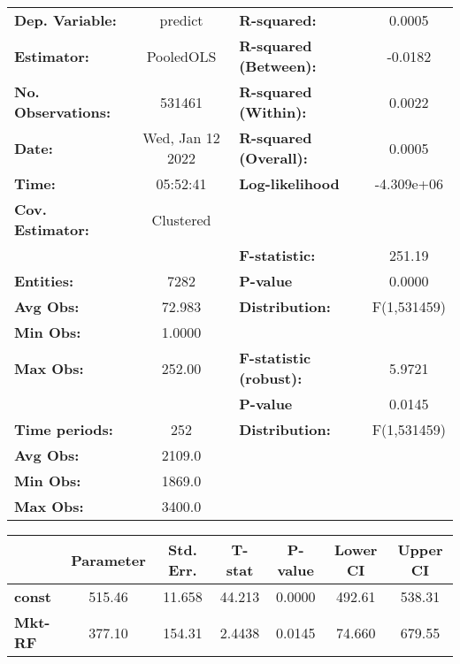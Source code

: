 \begin{center}
\begin{tabular}{lclc}
\toprule
\textbf{Dep. Variable:}    &      predict       & \textbf{  R-squared:         }   &      0.0005      \\
\textbf{Estimator:}        &     PooledOLS      & \textbf{  R-squared (Between):}  &     -0.0182      \\
\textbf{No. Observations:} &       531461       & \textbf{  R-squared (Within):}   &      0.0022      \\
\textbf{Date:}             &  Wed, Jan 12 2022  & \textbf{  R-squared (Overall):}  &      0.0005      \\
\textbf{Time:}             &      05:52:41      & \textbf{  Log-likelihood     }   &    -4.309e+06    \\
\textbf{Cov. Estimator:}   &     Clustered      & \textbf{                     }   &                  \\
\textbf{}                  &                    & \textbf{  F-statistic:       }   &      251.19      \\
\textbf{Entities:}         &        7282        & \textbf{  P-value            }   &      0.0000      \\
\textbf{Avg Obs:}          &       72.983       & \textbf{  Distribution:      }   &   F(1,531459)    \\
\textbf{Min Obs:}          &       1.0000       & \textbf{                     }   &                  \\
\textbf{Max Obs:}          &       252.00       & \textbf{  F-statistic (robust):} &      5.9721      \\
\textbf{}                  &                    & \textbf{  P-value            }   &      0.0145      \\
\textbf{Time periods:}     &        252         & \textbf{  Distribution:      }   &   F(1,531459)    \\
\textbf{Avg Obs:}          &       2109.0       & \textbf{                     }   &                  \\
\textbf{Min Obs:}          &       1869.0       & \textbf{                     }   &                  \\
\textbf{Max Obs:}          &       3400.0       & \textbf{                     }   &                  \\
\bottomrule
\end{tabular}
\begin{tabular}{lcccccc}
                & \textbf{Parameter} & \textbf{Std. Err.} & \textbf{T-stat} & \textbf{P-value} & \textbf{Lower CI} & \textbf{Upper CI}  \\
\midrule
\textbf{const}  &       515.46       &       11.658       &      44.213     &      0.0000      &       492.61      &       538.31       \\
\textbf{Mkt-RF} &       377.10       &       154.31       &      2.4438     &      0.0145      &       74.660      &       679.55       \\
\bottomrule
\end{tabular}
\end{center}
